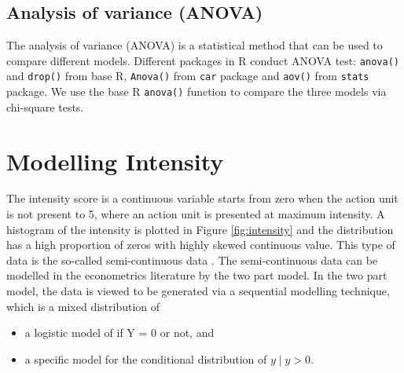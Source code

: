 \documentclass{monashthesis}
\begin{document}
\hypertarget{analysis-of-variance-anova}{%
\subsection{Analysis of variance (ANOVA)}\label{analysis-of-variance-anova}}

The analysis of variance (ANOVA) \autocites{faraway2016extending}{gelman2006data} is a statistical method that can be used to compare different models. Different packages in R conduct ANOVA test: \texttt{anova()} and \texttt{drop()} from base R, \texttt{Anova()} from \texttt{car} package and \texttt{aov()} from \texttt{stats} package. We use the base R \texttt{anova()} function to compare the three models via chi-square tests.

\hypertarget{modelling-intensity}{%
\section{Modelling Intensity}\label{modelling-intensity}}

The intensity score is a continuous variable starts from zero when the action unit is not present to 5, where an action unit is presented at maximum intensity. A histogram of the intensity is plotted in Figure \ref{fig:intensity} and the distribution has a high proportion of zeros with highly skewed continuous value. This type of data is the so-called semi-continuous data \autocites{Neelon2019}{twopart2010}. The semi-continuous data can be modelled in the econometrics literature by the two part model\autocites{cragg1971some}{manning1981two}. In the two part model, the data is viewed to be generated via a sequential modelling technique, which is a mixed distribution of

\begin{itemize}
\tightlist
\item
  a logistic model of if Y = 0 or not, and
\item
  a specific model for the conditional distribution of \(y \mid y > 0\).
\end{itemize}
\end{document}

